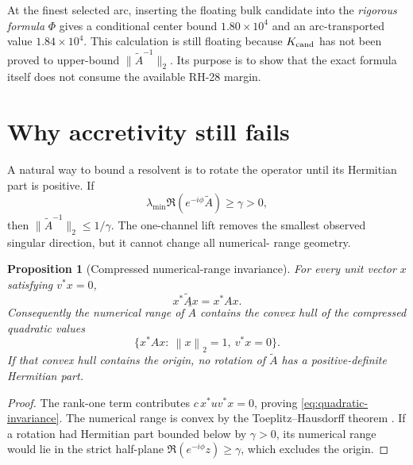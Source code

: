 \documentclass[11pt]{article}
\newtheorem{proposition}[theorem]{Proposition}
\theoremstyle{definition}
\theoremstyle{remark}
\newcommand{\norm}[1]{\left\lVert#1\right\rVert}
\newcommand{\Atilde}{\widetilde A}
\begin{document}
At the finest selected arc, inserting the floating bulk candidate into the
\emph{rigorous formula} $\Phi$ gives a conditional center bound
$1.80\times10^4$ and an arc-transported value $1.84\times10^4$.  This
calculation is still floating because $K_{\rm cand}$ has not been proved to
upper-bound $\|\Atilde^{-1}\|_2$.  Its purpose is to show that the exact
formula itself does not consume the available RH-28 margin.


\section{Why accretivity still fails}
\label{sec:no-go}

A natural way to bound a resolvent is to rotate the operator until its
Hermitian part is positive.  If
\[
 \lambda_{\min}\Re(e^{-i\phi}\Atilde)\geq\gamma>0,
\]
then $\|\Atilde^{-1}\|_2\leq1/\gamma$.  The one-channel lift removes the
smallest observed singular direction, but it cannot change all numerical-
range geometry.

\begin{proposition}[Compressed numerical-range invariance]
\label{prop:numerical-range-invariance}
For every unit vector $x$ satisfying $v^*x=0$,
\begin{equation}
 x^*\Atilde x=x^*Ax.
 \label{eq:quadratic-invariance}
\end{equation}
Consequently the numerical range of $\Atilde$ contains the convex hull of
the compressed quadratic values
\[
 \{x^*Ax:\ \norm x_2=1,\ v^*x=0\}.
\]
If that convex hull contains the origin, no rotation of $\Atilde$ has a
positive-definite Hermitian part.
\end{proposition}

\begin{proof}
The rank-one term contributes
$c\,x^*uv^*x=0$, proving \cref{eq:quadratic-invariance}.  The numerical range
is convex by the Toeplitz--Hausdorff theorem \citep{HornJohnson2013}.  If a
rotation had Hermitian part bounded below by $\gamma>0$, its numerical range
would lie in the strict half-plane
$\Re(e^{-i\phi}z)\geq\gamma$, which excludes the origin.
\end{proof}
\end{document}
